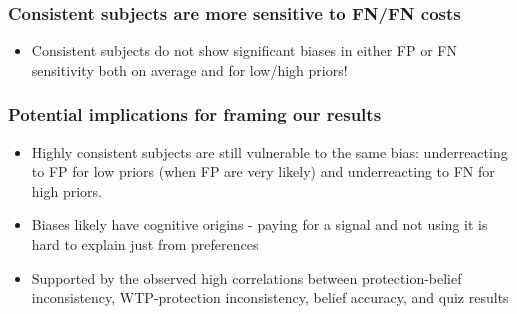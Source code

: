 \documentclass[11pt,hyperref={bookmarks=false}]{beamer}
\begin{document}
\begin{frame}
\frametitle{Consistent subjects are more sensitive to FN/FN costs}

\begin{itemize}
\item Consistent subjects do not show significant biases in either FP or FN sensitivity both on average and for low/high priors!
\end{itemize}
\begin{table}[htbp!]
\centering
{}
\end{table}
\end{frame}


\begin{frame}
\frametitle{Potential implications for framing our results}
\begin{itemize}
\item Highly consistent subjects are still vulnerable to the same bias: underreacting to FP for low priors (when FP are very likely) and underreacting to FN for high priors.
\item Biases likely have cognitive origins - paying for a signal and not using it is hard to explain just from preferences
\item Supported by the observed high correlations between protection-belief inconsistency, WTP-protection inconsistency, belief accuracy, and quiz results
\end{itemize}
\end{frame}
\end{document}
